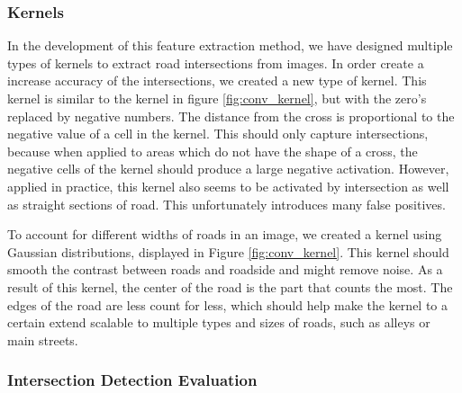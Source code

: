 \subsubsection{Kernels}
In the development of this feature extraction method, we have designed multiple types of kernels to extract road intersections from images. In order create a increase accuracy of the intersections, we created a new type of kernel. This kernel is similar to the kernel in figure \ref{fig:conv_kernel}, but with the zero's replaced by negative numbers. The distance from the cross is proportional to the negative value of a cell in the kernel. This should only capture intersections, because when applied to areas which do not have the shape of a cross, the negative cells of the kernel should produce a large negative activation. However, applied in practice, this kernel also seems to be activated by intersection as well as straight sections of road. This unfortunately introduces many false positives.

To account for different widths of roads in an image, we created a kernel using Gaussian distributions, displayed in Figure \ref{fig:conv_kernel}. This kernel should smooth
the contrast between roads and roadside and might remove noise. As a result of
this kernel, the center of the road is the part that counts the most. The edges
of the road are less count for less, which should help make the kernel to a certain extend scalable
to multiple types and sizes of roads, such as alleys or main streets.


\subsubsection{Intersection Detection Evaluation}

